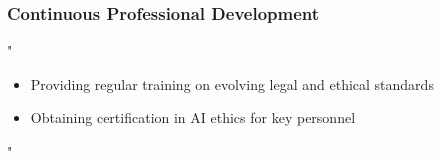 \documentclass[14pt,a4paper]{article}
\begin{document}
\textit{\parencite{ICO2024}}

\subsubsection*{Continuous Professional Development}
"
\begin{itemize}
    \item Providing regular training on evolving legal and ethical standards
    \item Obtaining certification in AI ethics for key personnel
\end{itemize}
"

\textit{\parencite{CIPD2024}}


\newpage

\printbibliography
\end{document}
